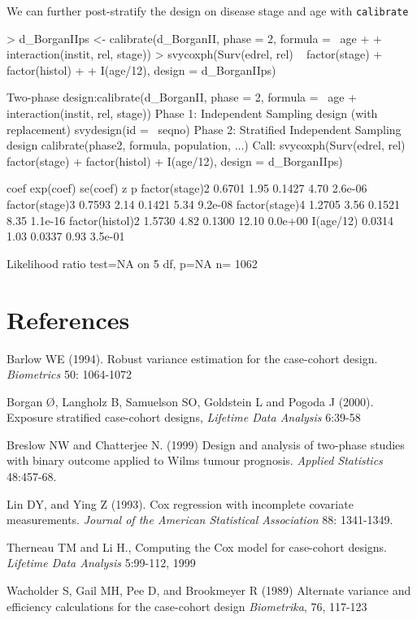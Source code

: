 \documentclass{article}
\begin{document}
We can further post-stratify the design on disease stage and age with \texttt{calibrate}
\begin{Schunk}
\begin{Sinput}
> d_BorganIIps <- calibrate(d_BorganII, phase = 2, formula = ~age + 
+     interaction(instit, rel, stage))
> svycoxph(Surv(edrel, rel) ~ factor(stage) + factor(histol) + 
+     I(age/12), design = d_BorganIIps)
\end{Sinput}
\begin{Soutput}
Two-phase design:calibrate(d_BorganII, phase = 2, formula = ~age + interaction(instit, 
    rel, stage))
Phase 1:
Independent Sampling design (with replacement)
svydesign(id = ~seqno)
Phase 2:
Stratified Independent Sampling design
calibrate(phase2, formula, population, ...)
Call:
svycoxph(Surv(edrel, rel) ~ factor(stage) + factor(histol) + 
    I(age/12), design = d_BorganIIps)


                  coef exp(coef) se(coef)     z       p
factor(stage)2  0.6701      1.95   0.1427  4.70 2.6e-06
factor(stage)3  0.7593      2.14   0.1421  5.34 9.2e-08
factor(stage)4  1.2705      3.56   0.1521  8.35 1.1e-16
factor(histol)2 1.5730      4.82   0.1300 12.10 0.0e+00
I(age/12)       0.0314      1.03   0.0337  0.93 3.5e-01

Likelihood ratio test=NA  on 5 df, p=NA  n= 1062 
\end{Soutput}
\end{Schunk}


\section*{References}

Barlow WE (1994). Robust variance estimation for the case-cohort
design. \emph{Biometrics} 50: 1064-1072

Borgan \O, Langholz B, Samuelson SO, Goldstein L and Pogoda J (2000). Exposure stratified case-cohort designs,  \emph{Lifetime Data Analysis}  6:39-58

Breslow NW and Chatterjee N. (1999) Design and analysis of two-phase
studies with binary outcome applied to Wilms tumour prognosis.  \emph{Applied
Statistics}  48:457-68.


Lin DY, and Ying Z (1993). Cox regression with incomplete covariate measurements.
\emph{Journal of the American Statistical Association} 88: 1341-1349.

Therneau TM and Li H., Computing the Cox model for case-cohort
designs. \emph{Lifetime Data Analysis} 5:99-112, 1999

Wacholder S, Gail MH, Pee D, and Brookmeyer R (1989)
Alternate variance and efficiency calculations for the case-cohort design
\emph{Biometrika}, 76, 117-123 
\end{document}
